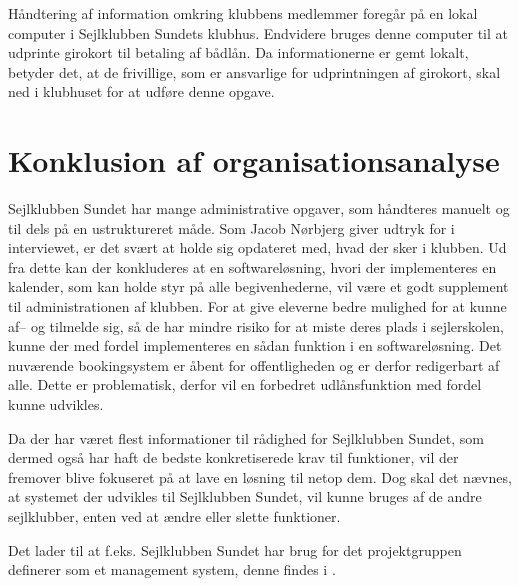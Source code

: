 Håndtering af information omkring klubbens medlemmer foregår på en lokal computer i Sejlklubben Sundets klubhus. 
Endvidere bruges denne computer til at udprinte girokort til betaling af bådlån. 
Da informationerne er gemt lokalt, betyder det, at de frivillige, som er ansvarlige for udprintningen af girokort, skal ned i klubhuset for at udføre denne opgave.


\section{Konklusion af organisationsanalyse}\label{sec:organisation-konklusion}

Sejlklubben Sundet har mange administrative opgaver, som håndteres manuelt og til dels på en ustruktureret måde. 
Som Jacob Nørbjerg giver udtryk for i interviewet, er det svært at holde sig opdateret med, hvad der sker i klubben.
Ud fra dette kan der konkluderes at en softwareløsning, hvori der implementeres en kalender, som kan holde styr på alle begivenhederne, vil være et godt supplement til administrationen af klubben. 
For at give eleverne bedre mulighed for at kunne af-- og tilmelde sig, så de har mindre risiko for at miste deres plads i sejlerskolen, kunne der med fordel implementeres en sådan funktion i en softwareløsning. 
Det nuværende bookingsystem er åbent for offentligheden og er derfor redigerbart af alle.
Dette er problematisk, derfor vil en forbedret udlånsfunktion med fordel kunne udvikles.

Da der har været flest informationer til rådighed for Sejlklubben Sundet, som dermed også har haft de bedste konkretiserede krav til funktioner, vil der fremover blive fokuseret på at lave en løsning til netop dem. 
Dog skal det nævnes, at systemet der udvikles til Sejlklubben Sundet, vil kunne bruges af de andre sejlklubber, enten ved at ændre eller slette funktioner. 

Det lader til at f.eks. Sejlklubben Sundet har brug for det projektgruppen definerer som et management system, denne findes i .